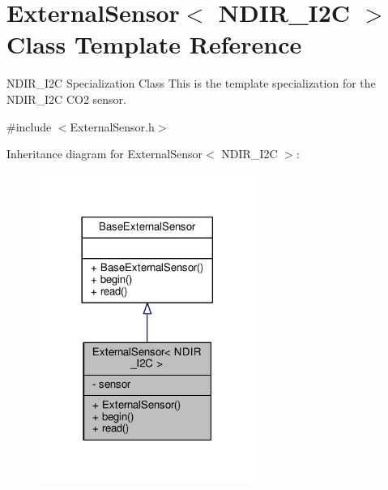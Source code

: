 \hypertarget{classExternalSensor_3_01NDIR__I2C_01_4}{}\section{External\+Sensor$<$ N\+D\+I\+R\+\_\+\+I2C $>$ Class Template Reference}
\label{classExternalSensor_3_01NDIR__I2C_01_4}


N\+D\+I\+R\+\_\+\+I2C Specialization Class This is the template specialization for the N\+D\+I\+R\+\_\+\+I2C C\+O2 sensor.  




{\ttfamily \#include $<$External\+Sensor.\+h$>$}



Inheritance diagram for External\+Sensor$<$ N\+D\+I\+R\+\_\+\+I2C $>$\+:
\nopagebreak
\begin{figure}[H]
\begin{center}
\leavevmode
\includegraphics[width=201pt]{classExternalSensor_3_01NDIR__I2C_01_4__inherit__graph}
\end{center}
\end{figure}


